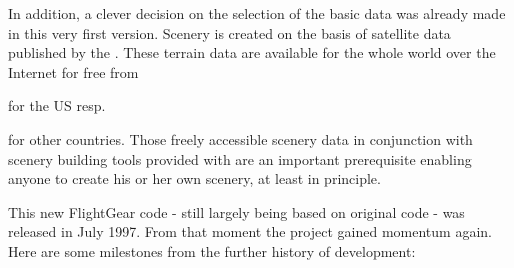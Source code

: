In addition, a clever decision on the selection of the basic
 data was already made in this very first version.
\FlightGear Scenery is created on the basis of satellite data
published by the . These terrain
data are available for the whole world over the Internet for free
from


\noindent
 for the US resp.


\noindent
 for other countries. Those freely accessible scenery data in
 conjunction with scenery building tools provided with
 \FlightGear are an important prerequisite enabling anyone to
  create his or her own scenery, at least in principle.

This new FlightGear code - still largely being based on original  code -
was released in July 1997. From that moment the project gained momentum again. Here are
some milestones from the further history of development:

